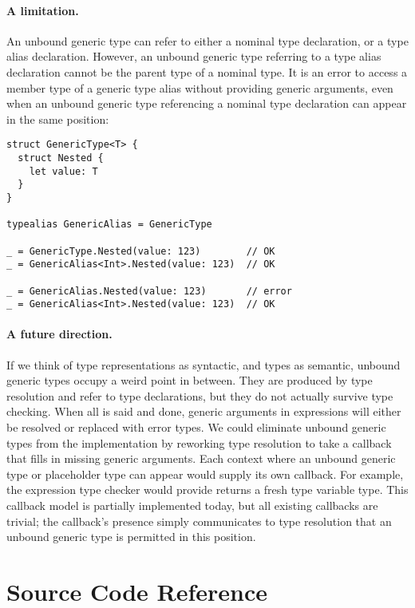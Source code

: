 \documentclass[../generics]{subfiles}
\begin{document}
\paragraph{A limitation.} An unbound generic type can refer to either a nominal type declaration, or a type alias declaration. However, an unbound generic type referring to a type alias declaration cannot be the parent type of a nominal type. It is an error to access a member type of a generic type alias without providing generic arguments, even when an unbound generic type referencing a nominal type declaration can appear in the same position:
\begin{Verbatim}
struct GenericType<T> {
  struct Nested {
    let value: T
  }
}

typealias GenericAlias = GenericType

_ = GenericType.Nested(value: 123)        // OK
_ = GenericAlias<Int>.Nested(value: 123)  // OK

_ = GenericAlias.Nested(value: 123)       // error
_ = GenericAlias<Int>.Nested(value: 123)  // OK
\end{Verbatim}

\paragraph{A future direction.} If we think of type representations as syntactic, and types as semantic, unbound generic types occupy a weird point in between. They are produced by type resolution and refer to type declarations, but they do not actually survive type checking. When all is said and done, generic arguments in expressions will either be resolved or replaced with error types. We could eliminate unbound generic types from the implementation by reworking type resolution to take a callback that fills in missing generic arguments. Each context where an unbound generic type or placeholder type can appear would supply its own callback. For example, the expression type checker would provide returns a fresh type variable type. This callback model is partially implemented today, but all existing callbacks are trivial; the callback's presence simply communicates to type resolution that an unbound generic type is permitted in this position.

\section{Source Code Reference}\label{type resolution source ref}
\end{document}

